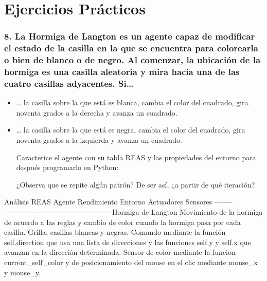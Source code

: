 \documentclass[11pt]{article}
\begin{document}
    \section{Ejercicios Prácticos}\label{ejercicios-pruxe1cticos}

\subsubsection{8. La Hormiga de Langton es un agente capaz de modificar
el estado de la casilla en la que se encuentra para colorearla o bien de
blanco o de negro. Al comenzar, la ubicación de la hormiga es una
casilla aleatoria y mira hacia una de las cuatro casillas adyacentes.
Si\ldots{}}\label{la-hormiga-de-langton-es-un-agente-capaz-de-modificar-el-estado-de-la-casilla-en-la-que-se-encuentra-para-colorearla-o-bien-de-blanco-o-de-negro.-al-comenzar-la-ubicaciuxf3n-de-la-hormiga-es-una-casilla-aleatoria-y-mira-hacia-una-de-las-cuatro-casillas-adyacentes.-si}

\begin{itemize}
\item
  \ldots{} la casilla sobre la que está es blanca, cambia el color del
  cuadrado, gira noventa grados a la derecha y avanza un cuadrado.
\item
  \ldots{} la casilla sobre la que está es negra, cambia el color del
  cuadrado, gira noventa grados a la izquierda y avanza un cuadrado.

  Caracterice el agente con su tabla REAS y las propiedades del entorno
  para después programarlo en Python:

  ¿Observa que se repite algún patrón? De ser así, ¿a partir de qué
  iteración?
\end{itemize}

    Análisis REAS \textbar{} Agente \textbar{} Rendimiento \textbar{}
Entorno \textbar{} Actuadores \textbar{} Sensores \textbar{}
\textbar--------\textbar-------------\textbar---------\textbar------------\textbar----------\textbar{}
\textbar{} Hormiga de Langton \textbar{} Movimiento de la hormiga de
acuerdo a las reglas y cambio de color cuando la hormiga pasa por cada
casilla. \textbar{} Grilla, casillas blancas y negras. \textbar{}
Comando mediante la función self.direction que usa una lista de
direcciones y las funciones self.y y self.x que avanzan en la dirección
determinada. \textbar{} Sensor de color mediante la funcion
current\_self\_color y de posicionamiento del mouse en el clic mediante
mouse\_x y mouse\_y. \textbar{}
\end{document}
